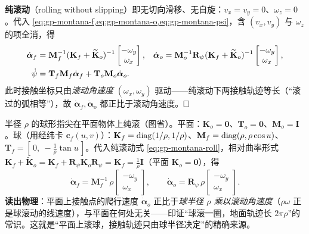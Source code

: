 \begin{derivation}[纯滚动的简化]
\textbf{纯滚动}（rolling without slipping）即无切向滑移、无自旋：$v_x=v_y=0$、$\omega_z=0$。代入 \cref{eq:gp-montana-f,eq:gp-montana-o,eq:gp-montana-psi}，含 $(v_x,v_y)$ 与 $\omega_z$ 的项全消，得
\begin{align}
  \dot{\boldsymbol{\alpha}}_f&=\mathbf{M}_f^{-1}(\mathbf{K}_f+\widetilde{\mathbf{K}}_o)^{-1}\begin{bmatrix}-\omega_y\\ \omega_x\end{bmatrix},
  &\dot{\boldsymbol{\alpha}}_o&=\mathbf{M}_o^{-1}\mathbf{R}_\psi(\mathbf{K}_f+\widetilde{\mathbf{K}}_o)^{-1}\begin{bmatrix}-\omega_y\\ \omega_x\end{bmatrix},
  \label{eq:gp-montana-roll}\\
  \dot{\psi}&=\mathbf{T}_f\mathbf{M}_f\dot{\boldsymbol{\alpha}}_f+\mathbf{T}_o\mathbf{M}_o\dot{\boldsymbol{\alpha}}_o. \notag
\end{align}
此时接触坐标只由\emph{滚动角速度} $(\omega_x,\omega_y)$ 驱动——纯滚动下两接触轨迹等长（“滚过的弧相等”），故 $\dot{\boldsymbol{\alpha}}_f,\dot{\boldsymbol{\alpha}}_o$ 都正比于滚动角速度。$\hfill\square$
\end{derivation}

\begin{example}\label{ex:gp-sphere-plane}
半径 $\rho$ 的球形指尖在平面物体上纯滚（图省）。平面：$\mathbf{K}_o=\mathbf{0}$、$\mathbf{T}_o=\mathbf{0}$、$\mathbf{M}_o=\mathbf{I}$。球（用经纬卡 $\mathbf{c}_f(u,v)$）：$\mathbf{K}_f=\operatorname{diag}(1/\rho,1/\rho)$、$\mathbf{M}_f=\operatorname{diag}(\rho,\rho\cos u)$、$\mathbf{T}_f=[\,0,\ -\tfrac{1}{\rho}\tan u\,]$。代入纯滚动式 \cref{eq:gp-montana-roll}，相对曲率形式 $\mathbf{K}_f+\widetilde{\mathbf{K}}_o=\mathbf{K}_f+\mathbf{R}_\psi\mathbf{K}_o\mathbf{R}_\psi=\mathbf{K}_f=\tfrac1\rho\mathbf{I}$（平面 $\mathbf{K}_o=\mathbf{0}$），得
\begin{equation}
  \dot{\boldsymbol{\alpha}}_f=\mathbf{M}_f^{-1}\,\rho\begin{bmatrix}-\omega_y\\ \omega_x\end{bmatrix},\qquad
  \dot{\boldsymbol{\alpha}}_o=\mathbf{R}_\psi\,\rho\begin{bmatrix}-\omega_y\\ \omega_x\end{bmatrix}.
  \label{eq:gp-sphere-result}
\end{equation}
\textbf{读出物理}：平面上接触点的爬行速度 $\dot{\boldsymbol{\alpha}}_o$ 正比于\emph{球半径 $\rho$ 乘以滚动角速度}（$\rho\omega$ 正是球滚动的线速度），与平面在何处无关——印证“球滚一圈，地面轨迹长 $2\pi\rho$”的常识。这就是“平面上滚球，接触轨迹只由球半径决定”的精确来源。
\end{example}

